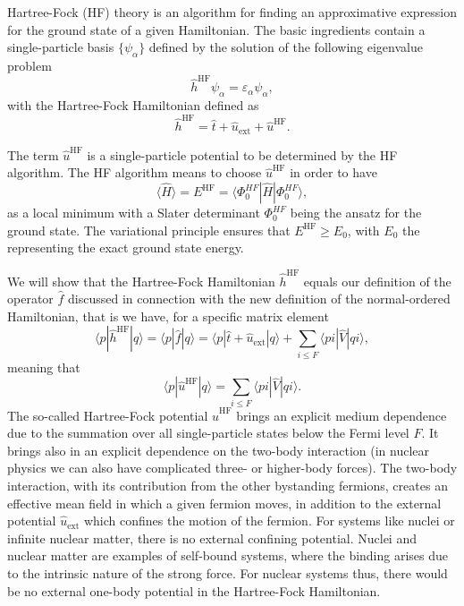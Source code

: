 Hartree-Fock (HF) theory is an algorithm for finding an approximative
expression for the ground state of a given Hamiltonian. The basic
ingredients contain a single-particle basis $\{\psi_{\alpha}\}$
defined by the solution of the following eigenvalue problem
\[ 
\hat{h}^{\mathrm{HF}}\psi_{\alpha} =\varepsilon_{\alpha}\psi_{\alpha},
\]
with the Hartree-Fock Hamiltonian defined as
\[
\hat{h}^{\mathrm{HF}}=\hat{t}+\hat{u}_{\mathrm{ext}}+\hat{u}^{\mathrm{HF}}.
\]

The term $\hat{u}^{\mathrm{HF}}$ is a single-particle potential to be
determined by the HF algorithm. The HF algorithm means to choose
$\hat{u}^{\mathrm{HF}}$ in order to have
\[ \langle \hat{H} \rangle = E^{\mathrm{HF}}= \langle \Phi_0^{HF} | \hat{H}|\Phi_0^{HF} \rangle,
\]
as a local minimum with a Slater determinant
$\Phi_0^{HF}$ being the ansatz for the ground state.  The variational
principle ensures that $E^{\mathrm{HF}} \ge E_0$, with $E_0$ the representing the exact
ground state energy.

We will show that the Hartree-Fock Hamiltonian $\hat{h}^{\mathrm{HF}}$
equals our definition of the operator $\hat{f}$ discussed in
connection with the new definition of the normal-ordered Hamiltonian,
that is we have, for a specific matrix element
\[
\langle p |\hat{h}^{\mathrm{HF}}| q \rangle =\langle p |\hat{f}| q
\rangle=\langle p|\hat{t}+\hat{u}_{\mathrm{ext}}|q \rangle +\sum_{i\le
  F} \langle pi | \hat{V} | qi\rangle,
\]
meaning that
\[
\langle p|\hat{u}^{\mathrm{HF}}|q\rangle = \sum_{i\le F} \langle pi |
\hat{V} | qi\rangle.
\]
The so-called Hartree-Fock potential $\hat{u}^{\mathrm{HF}}$ brings an
explicit medium dependence due to the summation over all
single-particle states below the Fermi level $F$. It brings also in an
explicit dependence on the two-body interaction (in nuclear physics we
can also have complicated three- or higher-body forces). The two-body
interaction, with its contribution from the other bystanding fermions,
creates an effective mean field in which a given fermion moves, in
addition to the external potential $\hat{u}_{\mathrm{ext}}$ which
confines the motion of the fermion. For systems like nuclei or
infinite nuclear matter, there is no external confining
potential. Nuclei and nuclear matter are examples of self-bound
systems, where the binding arises due to the intrinsic nature of the
strong force. For nuclear systems thus, there would be no external
one-body potential in the Hartree-Fock Hamiltonian.


